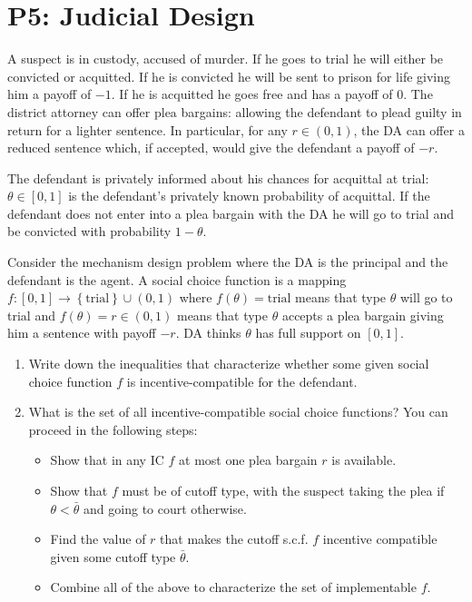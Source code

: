 \documentclass{article}
\newcommand{\enterProblemHeader}[1]{
\nobreak\extramarks{#1}{#1 continued on next page\ldots}\nobreak
\nobreak\extramarks{#1 (continued)}{#1 continued on next page\ldots}\nobreak
}
\newcommand{\exitProblemHeader}[1]{
\nobreak\extramarks{#1 (continued)}{#1 continued on next page\ldots}\nobreak
\nobreak\extramarks{#1}{}\nobreak
}
\newcounter{homeworkProblemCounter} %
\newcommand{\homeworkProblemName}{}
\newenvironment{ex}[1][Problem \arabic{homeworkProblemCounter}]{ %
\stepcounter{homeworkProblemCounter} %
\renewcommand{\homeworkProblemName}{#1} %
\section{\homeworkProblemName} %
}{
}
\begin{document}
\begin{ex}[P5: Judicial Design]
	A suspect is in custody, accused of murder.  If he goes to trial he will either be convicted or acquitted. If he
is convicted he will be sent to prison for life giving him a payoff of $-1$.  If he is acquitted he goes free and has a
payoff of $0$.  The district attorney can offer plea bargains: allowing the defendant to plead guilty in return for a
lighter sentence.  In
particular, for any $r\in (0,1)$, the DA can offer a reduced sentence which, if accepted, would give the defendant
a payoff of $-r.$

	
	The defendant is privately informed about his chances for acquittal at trial:  $\theta\in [0,1]$ is the defendant's privately
known probability of acquittal.  If the defendant does not enter into a plea bargain with the DA he will go to trial and
be convicted with probability $1 - \theta$.

	
	Consider the mechanism design problem where the DA is the principal and the defendant is the agent.  A social choice
function is a mapping $f:[0,1] \rightarrow \left\{ \text{trial} \right\} \cup (0,1)$ where $f(\theta) = \text{trial}$ means
that type $\theta$ will go to trial and $f(\theta) = r \in (0,1)$ means that type $\theta$ accepts a plea bargain
giving him a sentence with payoff $-r$.
DA thinks $\theta$ has full support on $[0,1]$.
	
	\begin{enumerate}

		\item Write down the inequalities that characterize whether some given social choice function $f$ is incentive-compatible
for the defendant.

		\item What is the set of all incentive-compatible social choice functions?
You can proceed in the following steps:
		\begin{itemize}
			\item Show that in any IC $f$ at most one plea bargain $r$ is available.
			\item Show that $f$ must be of cutoff type, with the suspect taking the plea if $\theta < \bar{\theta}$ and going to court otherwise.
			\item Find the value of $r$ that makes the cutoff s.c.f. $f$ incentive compatible given some cutoff type $\bar{\theta}$.
			\item Combine all of the above to characterize the set of implementable $f$.
		\end{itemize}
	\end{enumerate}



\end{ex}
\end{document}
